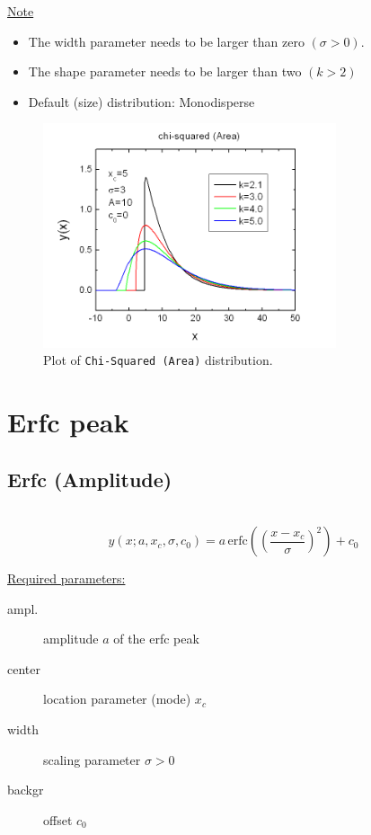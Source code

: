 \underline{Note}
\begin{itemize}
  \item The width parameter needs to be larger than zero $(\sigma>0)$.
  \item The shape parameter needs to be larger than two $(k>2)$
  \item Default (size) distribution: Monodisperse
\end{itemize}
\begin{figure}[htb]
\begin{center}
\includegraphics[width=0.768\textwidth]{ChiSquaredArea.png}
\end{center}
\caption{Plot of \texttt{Chi-Squared (Area)} distribution.}
\label{fig:ChiSquaredArea}
\end{figure}

\clearpage
\section{Erfc peak}
\label{sec:ErfcPeak}
\subsection{Erfc (Amplitude)} \hspace{1pt} \\
\label{sec:ErfcPeakAmplitude}
\begin{equation}
y(x;a,x_c,\sigma,c_0) = a \, \textrm{erfc}\left(\left(\frac{x-x_c}{\sigma}\right)^2\right)+c_0
\end{equation}
\vspace{5mm}

\underline{Required parameters:}
\begin{description}
    \item[ampl.] amplitude $a$ of the erfc peak
    \item[center] location parameter (mode) $x_c$
    \item[width] scaling parameter $\sigma>0$
    \item[backgr] offset $c_0$
\end{description}

